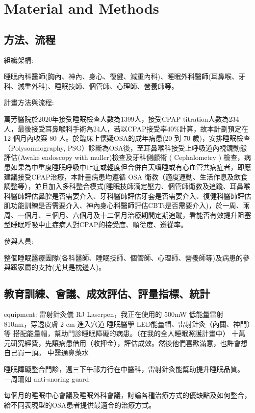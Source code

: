 \documentclass{proposalnsf}
\begin{document}
\section{Material and Methods}

\subsection{方法、流程}
組織架構: 

睡眠內科醫師(胸內、神內、身心、復健、減重內科)、睡眠外科醫師(耳鼻喉、牙科、減重外科)、睡眠技師、個管師、心理師、營養師等。

計畫方法與流程:

萬芳醫院於2020年接受睡眠檢查人數為1399人，接受CPAP titration人數為234人，最後接受耳鼻喉科手術為24人，若以CPAP接受率40\%計算，故本計劃預定在 12 個月內收案 80 人。於臨床上懷疑OSA的成年病患(20 到 70 歲)，安排睡眠檢查（Polysomnography, PSG）診斷為OSA後，至耳鼻喉科接受上呼吸道內視鏡動態評估(Awake endoscopy with muller)檢查及牙科側顱術 ( Cephalometry ) 檢查，病患如果為中重度睡眠呼吸中止症或輕度但合併白天嗜睡或有心血管共病症者，即應建議接受CPAP治療，本計畫病患均遵循 OSA 衛教（適度運動、生活作息及飲食調整等），並且加入多科整合模式(睡眠技師滴定壓力、個管師衛教及追蹤、耳鼻喉科醫師評估鼻腔是否需要介入、牙科醫師評估牙套是否需要介入、復健科醫師評估肌功能訓練是否需要介入、神內身心科醫師評估CBTi是否需要介入)，於一周、兩周、一個月、三個月、六個月及十二個月治療期間定期追蹤，看能否有效提升阻塞型睡眠呼吸中止症病人對CPAP的接受度、順從度、遵從率。



參與人員:

整個睡眠醫療團隊(各科醫師、睡眠技師、個管師、心理師、營養師等)及病患的參與跟家屬的支持(尤其是枕邊人)。

\subsection{教育訓練、會議、成效評估、評量指標、統計}

equipment:
雷射針灸儀 RJ Laserpen，我正在使用的 500mW 低能量雷射 810nm，穿透皮膚 2 cm 進入穴道
睡眠醫學 LED能量帽、雷射針灸（內關、神門）等
搭配能量帽，幫助門診睡眠障礙的病患。（在我的全人睡眠照護計畫中）
十萬元研究經費，先讓病患借用（收押金），評估成效。然後他們喜歡滿意，也許會想自己買一頂。
中醫通鼻藥水

睡眠障礙整合門診，週三下午祁力行在中醫科，雷射針灸能幫助提升睡眠品質。
—周珊如 anti-snoring guard

每個月的睡眠中心會議及睡眠外科會議，討論各種治療方式的優缺點及如何整合，給不同表現型的OSA患者提供最適合的治療方式。
\end{document}
